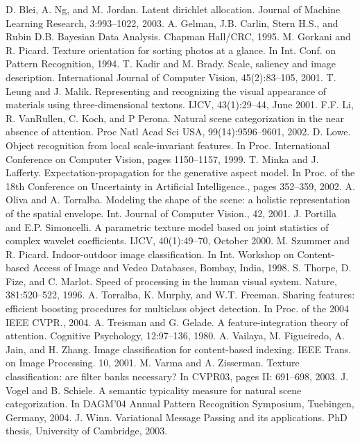\documentclass[10pt,a4paper,twocolumn]{article}
\begin{document}
\begin{thebibliography}{20}

D. Blei, A. Ng, and M. Jordan. Latent dirichlet allocation. Journal of Machine Learning Research, 3:993–1022, 2003.
A. Gelman, J.B. Carlin, Stern H.S., and Rubin D.B. Bayesian Data Analysis. Chapman Hall/CRC, 1995.
M. Gorkani and R. Picard. Texture orientation for sorting photos at a glance. In Int. Conf. on Pattern Recognition, 1994.
T. Kadir and M. Brady. Scale, saliency and image description. International Journal of Computer Vision, 45(2):83–105, 2001.
T. Leung and J. Malik. Representing and recognizing the visual appearance of materials using three-dimensional textons. IJCV, 43(1):29–44, June 2001.
F.F. Li, R. VanRullen, C. Koch, and P Perona. Natural scene categorization in the near absence of attention. Proc Natl Acad Sci USA, 99(14):9596–9601, 2002.
D. Lowe. Object recognition from local scale-invariant features. In Proc. International Conference on Computer Vision, pages 1150–1157, 1999.
T. Minka and J. Lafferty. Expectation-propagation for the generative aspect model. In Proc. of the 18th Conference on Uncertainty in Artificial Intelligence., pages 352–359, 2002.
A. Oliva and A. Torralba. Modeling the shape of the scene: a holistic representation of the spatial envelope. Int. Journal of Computer Vision., 42, 2001.
J. Portilla and E.P. Simoncelli. A parametric texture model based on joint statistics of complex wavelet coefficients. IJCV, 40(1):49–70, October 2000.
M. Szummer and R. Picard. Indoor-outdoor image classification. In Int. Workshop on Content-based Access of Image and Vedeo Databases, Bombay, India, 1998.
S. Thorpe, D. Fize, and C. Marlot. Speed of processing in the human visual system. Nature, 381:520–522, 1996.
A. Torralba, K. Murphy, and W.T. Freeman. Sharing features: efficient boosting procedures for multiclass object detection. In Proc. of the 2004 IEEE CVPR., 2004.
A. Treisman and G. Gelade. A feature-integration theory of attention. Cognitive Psychology, 12:97–136, 1980.
A. Vailaya, M. Figueiredo, A. Jain, and H. Zhang. Image classification for content-based indexing. IEEE Trans. on Image Processing. 10, 2001.
M. Varma and A. Zisserman. Texture classification: are filter banks necessary? In CVPR03, pages II: 691–698, 2003.
J. Vogel and B. Schiele. A semantic typicality measure for natural scene categorization. In DAGM’04 Annual Pattern Recognition Symposium, Tuebingen, Germany, 2004.
J. Winn. Variational Message Passing and its applications. PhD thesis, University of Cambridge, 2003.
\end{thebibliography}
\end{document}

